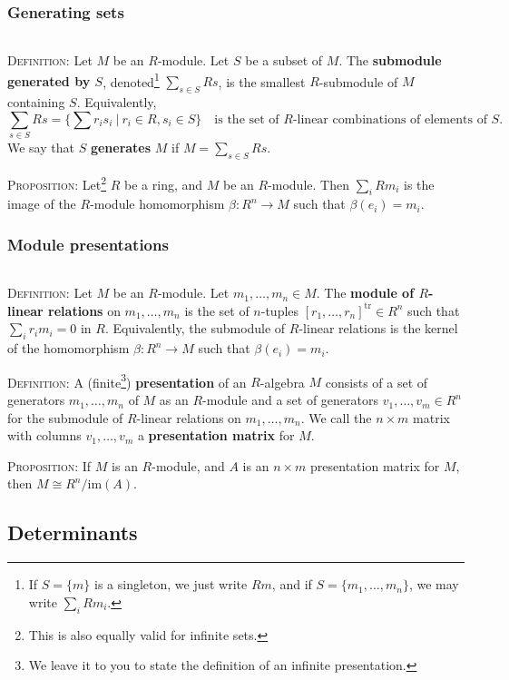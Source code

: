 \documentclass[12pt]{amsart}
\newcommand{\tr}{\mathrm{tr}}
\newcommand{\im}{\mathrm{im}}
\newcommand{\0}{$\phantom{.}$}
\newcommand{\1}{\mathbbm{1}}
\newcommand{\sssec}[1]{\subsubsection*{#1}}
\begin{document}
\sssec{Generating sets} \0

\noindent \textsc{Definition:} Let $M$ be an $R$-module. Let $S$ be a subset of $M$. The \textbf{submodule generated by $S$}, denoted\footnote{If $S=\{m\}$ is a singleton, we just write $Rm$, and if $S=\{m_1,\dots,m_n\}$, we may write $\sum_i R m_i$.} $\sum_{s\in S} Rs$, is the smallest $R$-submodule of $M$ containing $S$. Equivalently, 
\[ \sum_{s\in S} Rs = \big\{ \sum r_i s_i \ | \ r_i \in R, s_i \in S\big\} \quad \text{is the set of $R$-linear combinations of elements of $S$.}\]
We say that $S$ \textbf{generates} $M$ if $M=\sum_{s\in S} Rs$.

\vspace{2mm}

\noindent \textsc{Proposition:} Let\footnote{This is also equally valid for infinite sets.} $R$ be a ring, and $M$ be an $R$-module. Then $\sum_{i} R m_i$ is the image of the $R$-module homomorphism $\beta: R^n \to M$ such that $\beta(e_i)= m_i$.


\sssec{Module presentations}\0

\noindent \textsc{Definition:} Let $M$ be an $R$-module. Let $m_1,\dots,m_n\in M$. The \textbf{module of $R$-linear relations} on $m_1,\dots,m_n$ is the set of $n$-tuples $[r_1,\dots,r_n]^\tr \in R^n$ such that $\sum_i r_i m_i=0$ in $R$. Equivalently, the submodule of $R$-linear relations is the kernel of the homomorphism $\beta: R^n \to M$ such that $\beta(e_i)= m_i$.

\vspace{2mm}

\noindent \textsc{Definition:} A (finite\footnote{We leave it to you to state the definition of an infinite presentation.}) \textbf{presentation} of an $R$-algebra $M$ consists of a set of generators $m_1,\dots,m_n$ of $M$ as an $R$-module and a set of generators $v_1,\dots, v_m\in R^n$ for the submodule of $R$-linear relations on $m_1,\dots,m_n$. We call the $n \times m$ matrix with columns $v_1,\dots, v_m$ a \textbf{presentation matrix} for $M$. 

\vspace{2mm}

\noindent \textsc{Proposition:} If $M$ is an $R$-module, and $A$ is an $n\times m$ presentation matrix for $M$, then $M\cong R^n / \im(A)$.


\newpage




\subsection{Determinants}
\end{document}
